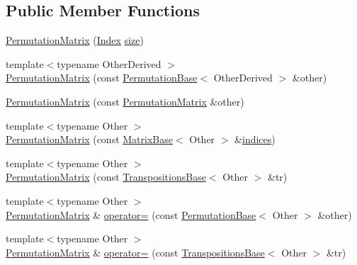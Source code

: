 \subsection*{Public Member Functions}
\begin{DoxyCompactItemize}
\item 
\mbox{\hyperlink{class_eigen_1_1_permutation_matrix_aea29eab1fd6a6562971db7b9c04c11aa}{Permutation\+Matrix}} (\mbox{\hyperlink{struct_eigen_1_1_eigen_base_a554f30542cc2316add4b1ea0a492ff02}{Index}} \mbox{\hyperlink{class_eigen_1_1_permutation_base_a2216f9ce7b453ac39c46ff0323daeac9}{size}})
\item 
{\footnotesize template$<$typename Other\+Derived $>$ }\\\mbox{\hyperlink{class_eigen_1_1_permutation_matrix_a7ae7016a606b08573013115dcf2e56f2}{Permutation\+Matrix}} (const \mbox{\hyperlink{class_eigen_1_1_permutation_base}{Permutation\+Base}}$<$ Other\+Derived $>$ \&other)
\item 
\mbox{\hyperlink{class_eigen_1_1_permutation_matrix_a75a003685dfbf43b2809df33012f1edd}{Permutation\+Matrix}} (const \mbox{\hyperlink{class_eigen_1_1_permutation_matrix}{Permutation\+Matrix}} \&other)
\item 
{\footnotesize template$<$typename Other $>$ }\\\mbox{\hyperlink{class_eigen_1_1_permutation_matrix_a204b8bbba3c4d33c1a24bb60ad72b202}{Permutation\+Matrix}} (const \mbox{\hyperlink{class_eigen_1_1_matrix_base}{Matrix\+Base}}$<$ Other $>$ \&\mbox{\hyperlink{class_eigen_1_1_permutation_matrix_a2f1ab379207fcd1ceb33941e25cf50c2}{indices}})
\item 
{\footnotesize template$<$typename Other $>$ }\\\mbox{\hyperlink{class_eigen_1_1_permutation_matrix_a0b9a4e51bea9c778a38f6e89db484af4}{Permutation\+Matrix}} (const \mbox{\hyperlink{class_eigen_1_1_transpositions_base}{Transpositions\+Base}}$<$ Other $>$ \&tr)
\item 
{\footnotesize template$<$typename Other $>$ }\\\mbox{\hyperlink{class_eigen_1_1_permutation_matrix}{Permutation\+Matrix}} \& \mbox{\hyperlink{class_eigen_1_1_permutation_matrix_aeced50f1c3a43b3e4b3de76d57e9c46a}{operator=}} (const \mbox{\hyperlink{class_eigen_1_1_permutation_base}{Permutation\+Base}}$<$ Other $>$ \&other)
\item 
{\footnotesize template$<$typename Other $>$ }\\\mbox{\hyperlink{class_eigen_1_1_permutation_matrix}{Permutation\+Matrix}} \& \mbox{\hyperlink{class_eigen_1_1_permutation_matrix_a75cdc77886972636637f22c41216feb9}{operator=}} (const \mbox{\hyperlink{class_eigen_1_1_transpositions_base}{Transpositions\+Base}}$<$ Other $>$ \&tr)

\end{DoxyCompactItemize}
